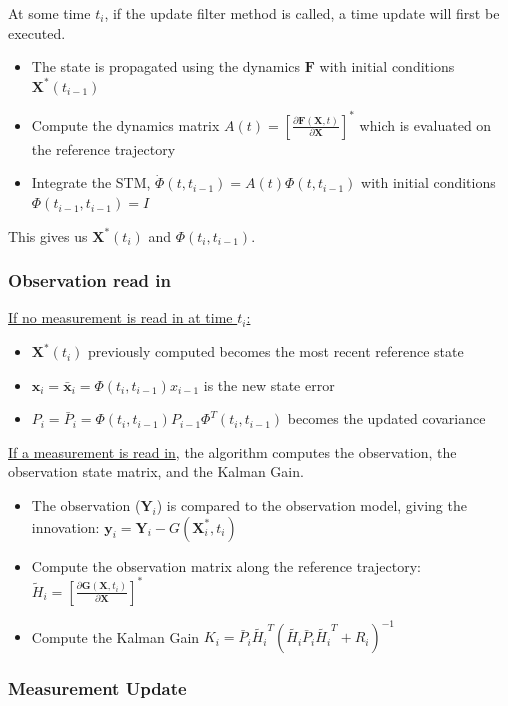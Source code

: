 \documentclass[]{BasiliskReportMemo}
\begin{document}
At some time $t_i$, if the update filter method is called, a time update will first be executed.

\begin{itemize}
\item The state is propagated using the dynamics $\bm F$ with initial conditions $\bm X^*(t_{i-1})$
\item Compute the dynamics matrix $A(t) = \left[\frac{\partial \bm F (\bm X, t)}{\partial \bm X}\right]^{*}$ which is evaluated on the reference trajectory
\item Integrate the STM, $\dot{\Phi}(t, t_{i-1}) = A(t) \Phi (t, t_{i-1})$ with initial conditions $\Phi(t_{i-1}, t_{i-1}) = I$
\end{itemize}

This gives us $\bm X^*(t_i)$ and $\Phi(t_{i}, t_{i-1})$.

\subsubsection*{Observation read in}

\underline{If no measurement is read in at time $t_i$:}

\begin{itemize}
\item $\bm X^*(t_i)$ previously computed becomes the most recent reference state
\item $\bm x_i = \bm \bar{x}_i = \Phi(t_{i}, t_{i-1}) x_{i-1}$ is the new state error 
\item $P_i = \bar{P}_i =\Phi(t_{i}, t_{i-1}) P_{i-1} \Phi^T(t_{i}, t_{i-1})$ becomes the updated covariance
\end{itemize}
\underline{If a measurement is read in}, the algorithm computes the observation, the observation state matrix, and the Kalman Gain.

\begin{itemize}
\item The observation ($\bm Y_i$) is compared to the observation model, giving the innovation: $\bm y_i = \bm Y_i - G(\bm X_i^*, t_i)$
\item Compute the observation matrix along the reference trajectory: $\tilde{H}_i = \left[\frac{\partial \bm G (\bm X, t_i)}{\partial \bm X}\right]^{*}$
\item Compute the Kalman Gain $K_i = \bar{P}_i \tilde{H_i}^T\left(\tilde{H_i} \bar{P}_i \tilde{H_i}^T + R_i \right)^{-1}$
\end{itemize}

\subsubsection*{Measurement Update}
\end{document}
